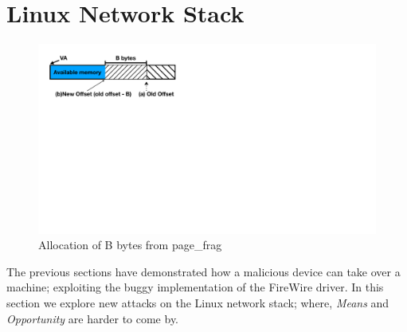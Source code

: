 \section{Linux Network Stack}\label{sec:linux_net}
\begin{figure}
    \centering
    \includegraphics[width=1\linewidth]{figs/page_frag.pdf}
    \caption{Allocation of B bytes from page\_frag}
    \label{fig:page_frags}
\end{figure}
The previous sections have demonstrated how a malicious device can take over a machine; exploiting the buggy implementation of the FireWire driver. In this section we explore new attacks on the Linux network stack; where, \textit{Means} and \textit{Opportunity} are harder to come by. 
